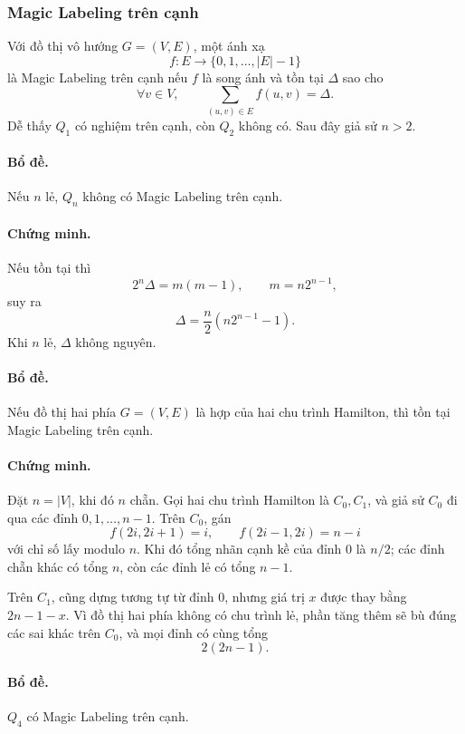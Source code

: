 \documentclass[11pt]{article}
\begin{document}
\subsubsection{Magic Labeling trên cạnh}

Với đồ thị vô hướng \(G=(V,E)\), một ánh xạ
\[
  f:E\to \{0,1,\ldots,|E|-1\}
\]
là Magic Labeling trên cạnh nếu \(f\) là song ánh và tồn tại \(\Delta\) sao cho
\[
  \forall v\in V,\qquad \sum_{(u,v)\in E} f(u,v)=\Delta.
\]
Dễ thấy \(Q_1\) có nghiệm trên cạnh, còn \(Q_2\) không có. Sau đây giả sử
\(n>2\).

\paragraph{Bổ đề.}
Nếu \(n\) lẻ, \(Q_n\) không có Magic Labeling trên cạnh.

\paragraph{Chứng minh.}
Nếu tồn tại thì
\[
  2^n\Delta=m(m-1),\qquad m=n2^{n-1},
\]
suy ra
\[
  \Delta=\frac n2(n2^{n-1}-1).
\]
Khi \(n\) lẻ, \(\Delta\) không nguyên.

\paragraph{Bổ đề.}
Nếu đồ thị hai phía \(G=(V,E)\) là hợp của hai chu trình Hamilton, thì tồn tại
Magic Labeling trên cạnh.

\paragraph{Chứng minh.}
Đặt \(n=|V|\), khi đó \(n\) chẵn. Gọi hai chu trình Hamilton là \(C_0,C_1\),
và giả sử \(C_0\) đi qua các đỉnh \(0,1,\ldots,n-1\). Trên \(C_0\), gán
\[
  f(2i,2i+1)=i,\qquad
  f(2i-1,2i)=n-i
\]
với chỉ số lấy modulo \(n\). Khi đó tổng nhãn cạnh kề của đỉnh \(0\) là
\(n/2\); các đỉnh chẵn khác có tổng \(n\), còn các đỉnh lẻ có tổng \(n-1\).

Trên \(C_1\), cũng dựng tương tự từ đỉnh \(0\), nhưng giá trị \(x\) được thay
bằng \(2n-1-x\). Vì đồ thị hai phía không có chu trình lẻ, phần tăng thêm sẽ
bù đúng các sai khác trên \(C_0\), và mọi đỉnh có cùng tổng
\[
  2(2n-1).
\]

\paragraph{Bổ đề.}
\(Q_4\) có Magic Labeling trên cạnh.
\end{document}
